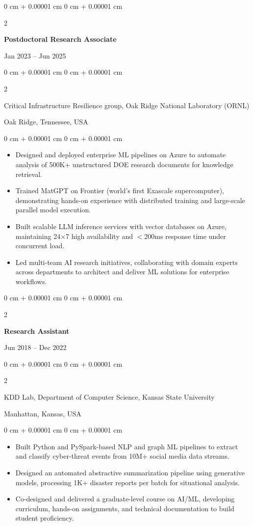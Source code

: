 \documentclass[10pt, letterpaper]{article}
\newenvironment{highlights}{
    \begin{itemize}[
        topsep=0.10 cm,
        parsep=0.10 cm,
        partopsep=0pt,
        itemsep=0pt,
        leftmargin=0 cm + 10pt
    ]
}{
    \end{itemize}
} %
\newenvironment{onecolentry}{
    \begin{adjustwidth}{
        0 cm + 0.00001 cm
    }{
        0 cm + 0.00001 cm
    }
}{
    \end{adjustwidth}
} %
\newenvironment{twocolentry}[2][]{
    \onecolentry
    \def\secondColumn{#2}
    \setcolumnwidth{\fill, 4.5 cm}
    \begin{paracol}{2}
}{
    \switchcolumn \raggedleft \secondColumn
    \end{paracol}
    \endonecolentry
} %
\begin{document}
    \begin{twocolentry}{Jan 2023 -- Jun 2025}
        \textbf{Postdoctoral Research Associate}
    \end{twocolentry}
    \begin{twocolentry}{Oak Ridge, Tennessee, USA}
        Critical Infrastructure Resilience group, Oak Ridge National Laboratory (ORNL)
    \end{twocolentry}
    \vspace{0.10 cm}
    \begin{onecolentry}
        \begin{highlights}
            \item Designed and deployed enterprise ML pipelines on Azure to automate analysis of 500K+ unstructured DOE research documents for knowledge retrieval.
            \item Trained MatGPT on Frontier (world’s first Exascale supercomputer), demonstrating hands-on experience with distributed training and large-scale parallel model execution.
            \item Built scalable LLM inference services with vector databases on Azure, maintaining 24×7 high availability and $<$200ms response time under concurrent load.
            \item Led multi-team AI research initiatives, collaborating with domain experts across departments to architect and deliver ML solutions for enterprise workflows.
        \end{highlights}
    \end{onecolentry}

    \vspace{1mm}
    
    \begin{twocolentry}{Jun 2018 -- Dec 2022}
        \textbf{Research Assistant}
    \end{twocolentry}
    \begin{twocolentry}{Manhattan, Kansas, USA}
       KDD Lab, Department of Computer Science, Kansas State University
    \end{twocolentry}
    \vspace{0.10 cm}
    \begin{onecolentry}
        \begin{highlights}
            \item Built Python and PySpark-based NLP and graph ML pipelines to extract and classify cyber-threat events from 10M+ social media data streams.
            \item Designed an automated abstractive summarization pipeline using generative models, processing 1K+ disaster reports per batch for situational analysis.
            \item Co-designed and delivered a graduate-level course on AI/ML, developing curriculum, hands-on assignments, and technical documentation to build student proficiency.
        \end{highlights}
    \end{onecolentry}
\end{document}
